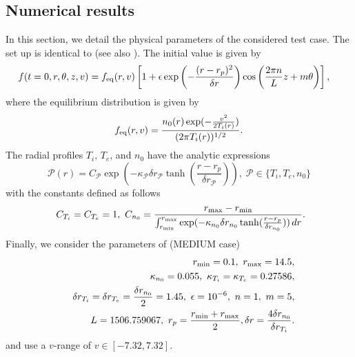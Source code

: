 \subsection{Numerical results \label{subsec:driftkinetic-results}}

In this section, we detail the physical parameters of the considered test case. The set up is identical to \cite{Crouseilles:2018} (see also 
\cite{Coulette:2013, Crouseilles:2014}). The initial value is given by 
\begin{align*}
f(t=0,r,\theta,z,v) &=
f_{\rm eq}(r,v)\left[1+\epsilon \exp\left(-\frac{(r-r_p)^2}{\delta r}\right)\cos\left(\frac{2\pi n}{L}z+m\theta\right)\right],
\end{align*}
where the equilibrium distribution is given by
\begin{equation} \label{eq:equilibrium}
f_{\rm eq}(r,v)=\frac{n_0(r)\exp(-\frac{v^2}{2T_i(r)})}{(2\pi T_i(r))^{1/2}}.
\end{equation}
The radial profiles $T_i$, $T_e$, and $n_0$ have the analytic expressions
$$
\mathcal{P}(r) = C_\mathcal{P}\exp\left(-\kappa_\mathcal{P}\delta r_{\mathcal{P}}\tanh(\frac{r-r_p}{\delta r_{\mathcal{P}}})\right), \; \mathcal{P}\in \{T_i,T_e,n_0\}
$$
with the constants defined as follows
$$
\ C_{T_i}=C_{T_e}=1,\ C_{n_0}=\frac{r_{\rm max}-r_{\rm min}}{
\int_{r_{\rm min}}^{r_{\rm max}}\exp(-\kappa_{n_0}\delta r_{n_0}\tanh(\frac{r-r_p}{\delta r_{n_0}}))\,dr}.
$$
Finally, we consider the parameters of \cite{Coulette:2013} (MEDIUM case)
\begin{eqnarray*}
&&r_{\rm min} = 0.1,\ r_{\rm max} = 14.5,\\
&& \kappa_{n_0}= 0.055,\ \kappa_{T_i}=\kappa_{T_e}= 0.27586,\\
&&\delta r_{T_i}=\delta r_{T_e}=\frac{\delta r_{n_0}}{2}= 1.45,\ \epsilon=10^{-6},\ n=1,\ m=5,\\
&&L=1506.759067,\ r_p = \frac{r_{\rm min}+r_{\rm max}}{2},\delta r = \frac{4 \delta r_{n_0}}{\delta r_{T_i}}.
\end{eqnarray*}
and use a $v$-range of $v \in [-7.32,7.32]$.


